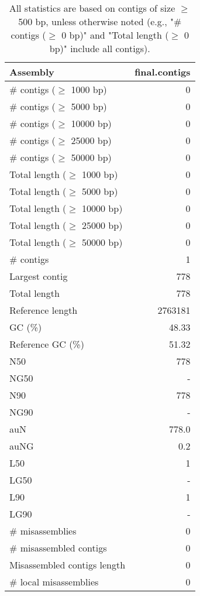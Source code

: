 \documentclass[12pt,a4paper]{article}
\begin{document}
\begin{table}[ht]
\begin{center}
\caption{All statistics are based on contigs of size $\geq$ 500 bp, unless otherwise noted (e.g., "\# contigs ($\geq$ 0 bp)" and "Total length ($\geq$ 0 bp)" include all contigs).}
\begin{tabular}{|l*{1}{|r}|}
\hline
Assembly & final.contigs \\ \hline
\# contigs ($\geq$ 1000 bp) & 0 \\ \hline
\# contigs ($\geq$ 5000 bp) & 0 \\ \hline
\# contigs ($\geq$ 10000 bp) & 0 \\ \hline
\# contigs ($\geq$ 25000 bp) & 0 \\ \hline
\# contigs ($\geq$ 50000 bp) & 0 \\ \hline
Total length ($\geq$ 1000 bp) & 0 \\ \hline
Total length ($\geq$ 5000 bp) & 0 \\ \hline
Total length ($\geq$ 10000 bp) & 0 \\ \hline
Total length ($\geq$ 25000 bp) & 0 \\ \hline
Total length ($\geq$ 50000 bp) & 0 \\ \hline
\# contigs & 1 \\ \hline
Largest contig & 778 \\ \hline
Total length & 778 \\ \hline
Reference length & 2763181 \\ \hline
GC (\%) & 48.33 \\ \hline
Reference GC (\%) & 51.32 \\ \hline
N50 & 778 \\ \hline
NG50 & - \\ \hline
N90 & 778 \\ \hline
NG90 & - \\ \hline
auN & 778.0 \\ \hline
auNG & 0.2 \\ \hline
L50 & 1 \\ \hline
LG50 & - \\ \hline
L90 & 1 \\ \hline
LG90 & - \\ \hline
\# misassemblies & 0 \\ \hline
\# misassembled contigs & 0 \\ \hline
Misassembled contigs length & 0 \\ \hline
\# local misassemblies & 0 \\ \hline

\end{tabular}
\end{center}
\end{table}
\end{document}
